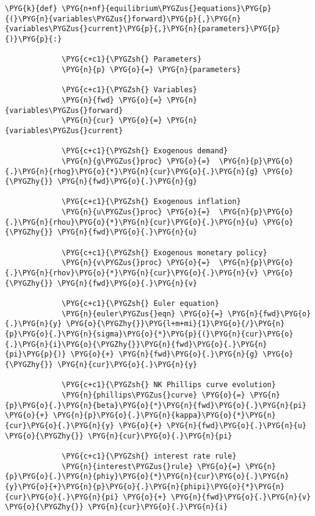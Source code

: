 \documentclass[letterpaper,10pt,openany,oneside,english]{sphinxmanual}
\begin{document}
\begin{Verbatim}[commandchars=\\\{\}]
         \PYG{k}{def} \PYG{n+nf}{equilibrium\PYGZus{}equations}\PYG{p}{(}\PYG{n}{variables\PYGZus{}forward}\PYG{p}{,}\PYG{n}{variables\PYGZus{}current}\PYG{p}{,}\PYG{n}{parameters}\PYG{p}{)}\PYG{p}{:}
         
             \PYG{c+c1}{\PYGZsh{} Parameters}
             \PYG{n}{p} \PYG{o}{=} \PYG{n}{parameters}
         
             \PYG{c+c1}{\PYGZsh{} Variables}
             \PYG{n}{fwd} \PYG{o}{=} \PYG{n}{variables\PYGZus{}forward}
             \PYG{n}{cur} \PYG{o}{=} \PYG{n}{variables\PYGZus{}current}
         
             \PYG{c+c1}{\PYGZsh{} Exogenous demand}
             \PYG{n}{g\PYGZus{}proc} \PYG{o}{=}  \PYG{n}{p}\PYG{o}{.}\PYG{n}{rhog}\PYG{o}{*}\PYG{n}{cur}\PYG{o}{.}\PYG{n}{g} \PYG{o}{\PYGZhy{}} \PYG{n}{fwd}\PYG{o}{.}\PYG{n}{g}
         
             \PYG{c+c1}{\PYGZsh{} Exogenous inflation}
             \PYG{n}{u\PYGZus{}proc} \PYG{o}{=}  \PYG{n}{p}\PYG{o}{.}\PYG{n}{rhou}\PYG{o}{*}\PYG{n}{cur}\PYG{o}{.}\PYG{n}{u} \PYG{o}{\PYGZhy{}} \PYG{n}{fwd}\PYG{o}{.}\PYG{n}{u}
         
             \PYG{c+c1}{\PYGZsh{} Exogenous monetary policy}
             \PYG{n}{v\PYGZus{}proc} \PYG{o}{=}  \PYG{n}{p}\PYG{o}{.}\PYG{n}{rhov}\PYG{o}{*}\PYG{n}{cur}\PYG{o}{.}\PYG{n}{v} \PYG{o}{\PYGZhy{}} \PYG{n}{fwd}\PYG{o}{.}\PYG{n}{v}
         
             \PYG{c+c1}{\PYGZsh{} Euler equation}
             \PYG{n}{euler\PYGZus{}eqn} \PYG{o}{=} \PYG{n}{fwd}\PYG{o}{.}\PYG{n}{y} \PYG{o}{\PYGZhy{}}\PYG{l+m+mi}{1}\PYG{o}{/}\PYG{n}{p}\PYG{o}{.}\PYG{n}{sigma}\PYG{o}{*}\PYG{p}{(}\PYG{n}{cur}\PYG{o}{.}\PYG{n}{i}\PYG{o}{\PYGZhy{}}\PYG{n}{fwd}\PYG{o}{.}\PYG{n}{pi}\PYG{p}{)} \PYG{o}{+} \PYG{n}{fwd}\PYG{o}{.}\PYG{n}{g} \PYG{o}{\PYGZhy{}} \PYG{n}{cur}\PYG{o}{.}\PYG{n}{y}
         
             \PYG{c+c1}{\PYGZsh{} NK Phillips curve evolution}
             \PYG{n}{phillips\PYGZus{}curve} \PYG{o}{=} \PYG{n}{p}\PYG{o}{.}\PYG{n}{beta}\PYG{o}{*}\PYG{n}{fwd}\PYG{o}{.}\PYG{n}{pi} \PYG{o}{+} \PYG{n}{p}\PYG{o}{.}\PYG{n}{kappa}\PYG{o}{*}\PYG{n}{cur}\PYG{o}{.}\PYG{n}{y} \PYG{o}{+} \PYG{n}{fwd}\PYG{o}{.}\PYG{n}{u} \PYG{o}{\PYGZhy{}} \PYG{n}{cur}\PYG{o}{.}\PYG{n}{pi}
         
             \PYG{c+c1}{\PYGZsh{} interest rate rule}
             \PYG{n}{interest\PYGZus{}rule} \PYG{o}{=} \PYG{n}{p}\PYG{o}{.}\PYG{n}{phiy}\PYG{o}{*}\PYG{n}{cur}\PYG{o}{.}\PYG{n}{y}\PYG{o}{+}\PYG{n}{p}\PYG{o}{.}\PYG{n}{phipi}\PYG{o}{*}\PYG{n}{cur}\PYG{o}{.}\PYG{n}{pi} \PYG{o}{+} \PYG{n}{fwd}\PYG{o}{.}\PYG{n}{v} \PYG{o}{\PYGZhy{}} \PYG{n}{cur}\PYG{o}{.}\PYG{n}{i}
         

\end{Verbatim}
\end{document}
